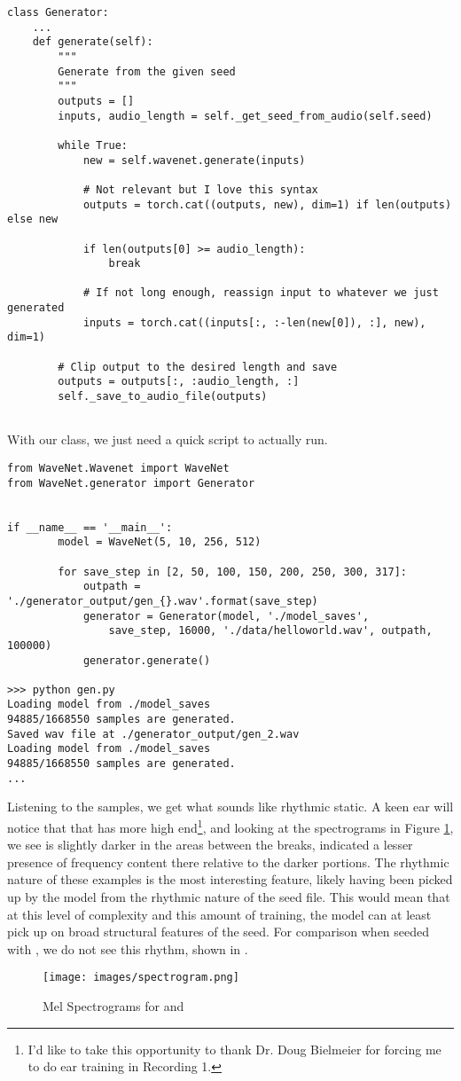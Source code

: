 \begin{verbatim}
class Generator:
    ...
    def generate(self):
        """
        Generate from the given seed
        """
        outputs = []
        inputs, audio_length = self._get_seed_from_audio(self.seed)

        while True:
            new = self.wavenet.generate(inputs)
            
            # Not relevant but I love this syntax
            outputs = torch.cat((outputs, new), dim=1) if len(outputs) else new

            if len(outputs[0] >= audio_length):
                break
                
            # If not long enough, reassign input to whatever we just generated
            inputs = torch.cat((inputs[:, :-len(new[0]), :], new), dim=1)
        
        # Clip output to the desired length and save
        outputs = outputs[:, :audio_length, :]
        self._save_to_audio_file(outputs)
        
\end{verbatim}

With our  class, we just need a quick script to actually run.

\begin{verbatim}
from WaveNet.Wavenet import WaveNet
from WaveNet.generator import Generator


if __name__ == '__main__':
        model = WaveNet(5, 10, 256, 512)

        for save_step in [2, 50, 100, 150, 200, 250, 300, 317]:
            outpath = './generator_output/gen_{}.wav'.format(save_step)
            generator = Generator(model, './model_saves',
                save_step, 16000, './data/helloworld.wav', outpath, 100000)
            generator.generate()

>>> python gen.py
Loading model from ./model_saves
94885/1668550 samples are generated.
Saved wav file at ./generator_output/gen_2.wav
Loading model from ./model_saves
94885/1668550 samples are generated.
...
\end{verbatim}

Listening to the samples, we get what sounds like rhythmic static. A keen ear will notice that that  has more high end\footnote{I'd like to take this opportunity to thank Dr. Doug Bielmeier for forcing me to do ear training in Recording 1.}, and looking at the spectrograms in Figure \ref{fig:specgram}, we see  is slightly darker in the areas between the breaks, indicated a lesser presence of frequency content there relative to the darker portions. The rhythmic nature of these examples is the most interesting feature, likely having been picked up by the model from the rhythmic nature of the seed file. This would mean that at this level of complexity and this amount of training, the model can at least pick up on broad structural features of the seed. For comparison when seeded with , we do not see this rhythm, shown in .

\begin{figure}[htbp]
    \centering
    \texttt{[image: images/spectrogram.png]}
    \caption{Mel Spectrograms for  and }
    \label{fig:specgram}
\end{figure}
